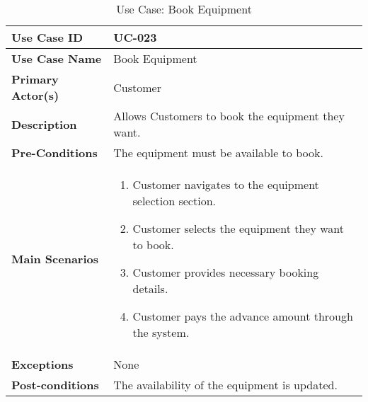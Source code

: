 \begin{table}[ht]
    \centering
    \begin{tabular}{|l|p{}|}
        \hline
        \textbf{Use Case ID} & UC-023 \\
        \hline
        \textbf{Use Case Name} & Book Equipment \\
        \hline
        \textbf{Primary Actor(s)} & Customer \\
        \hline
        \textbf{Description} & Allows Customers to book the equipment they want. \\
        \hline
        \textbf{Pre-Conditions} & The equipment must be available to book. \\
        \hline
        \textbf{Main Scenarios} & 
        \begin{enumerate}[label=\arabic*.,itemsep=0pt]
            \item Customer navigates to the equipment selection section.
            \item Customer selects the equipment they want to book.
            \item Customer provides necessary booking details.
            \item Customer pays the advance amount through the system.
        \end{enumerate} \\
        \hline
        \textbf{Exceptions} & None \\
        \hline
        \textbf{Post-conditions} & The availability of the equipment is updated. \\
        \hline
    \end{tabular}
    \label{tab:use-case-book-equipment}
    \caption{Use Case: Book Equipment}
\end{table}

